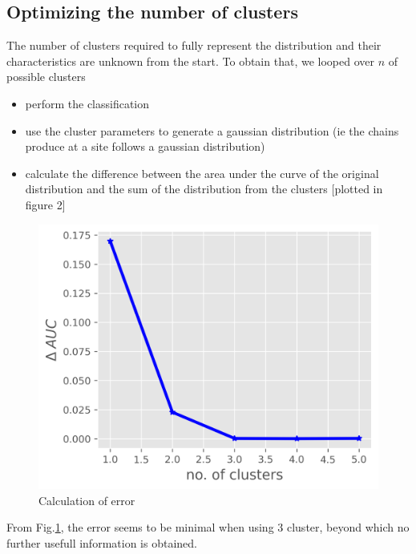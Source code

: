 \documentclass[12pt,letter]{article}
\begin{document}
\subsection*{Optimizing the number of clusters}
The number of clusters required to fully represent the distribution and their characteristics are unknown from the start. To obtain that, we looped over $n$ of possible clusters
\begin{itemize}
	\item perform the classification
	\item use the cluster parameters to generate a gaussian distribution (ie the chains produce at a site follows a gaussian distribution)
	\item calculate the difference between the area under the curve of the original distribution and the sum of the distribution from the clusters [plotted in figure 2]
\end{itemize} 
\begin{figure}[!htb]
	\begin{center}	
	\includegraphics[scale=1]{figures/error_curve}
	\caption{Calculation of error}
	\label{fig:error}
	\end{center}
\end{figure}
From Fig.\ref{fig:error}, the error seems to be minimal when using 3 cluster, beyond which no further usefull information is obtained. 
\end{document}
